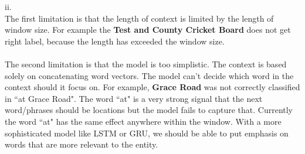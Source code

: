 \documentclass[10pt]{article}
\begin{document}
\begin{enumerate}[label=(\alph*)]
ii.\\
The first limitation is that the length of context is limited by the length of window size.
For example the \textbf{Test and County Cricket Board} does not get right label, because the length has exceeded the window size.\\
\\
The second limitation is that the model is too simplistic. The context is based solely on concatenating word vectors. The model can't decide which word in the context should it focus on. For example, \textbf{Grace Road} was not correctly classified in ``at Grace Road". The word ``at" is a very strong signal that the next word/phrases should be locations but the model fails to capture that. Currently the word ``at" has the same effect anywhere within the window. With a more sophisticated model like LSTM or GRU, we should be able to put emphasis on words that are more relevant to the entity.

\end{enumerate}
\clearpage
\end{document}
